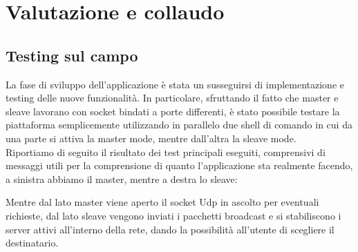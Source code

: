 \documentclass[11pt,fleqn]{book} %
\begin{document}

\chapter{Valutazione e collaudo}

\section{Testing sul campo}
La fase di sviluppo dell'applicazione è stata un susseguirsi di implementazione e testing delle nuove funzionalità. In particolare, sfruttando il fatto che master e sleave lavorano con socket bindati a porte differenti, è stato possibile testare la piattaforma semplicemente utilizzando in parallelo due shell di comando in cui da una parte si attiva la master mode, mentre dall'altra la sleave mode.\\
Riportiamo di seguito il risultato dei test principali eseguiti, comprensivi di messaggi utili per la comprensione di quanto l'applicazione sta realmente facendo, a sinistra abbiamo il master, mentre a destra lo sleave:

\begin{Parallel}{0.5\textwidth}{0.5\textwidth}
\ParallelPar
\end{Parallel}

Mentre dal lato master viene aperto il socket Udp in ascolto per eventuali richieste, dal lato sleave vengono inviati i pacchetti 				broadcast e si stabiliscono i server attivi all'interno della rete, dando la possibilità all'utente di scegliere il destinatario.

\begin{Parallel}{0.5\textwidth}{0.5\textwidth}
\ParallelPar
\end{Parallel}
\end{document}
